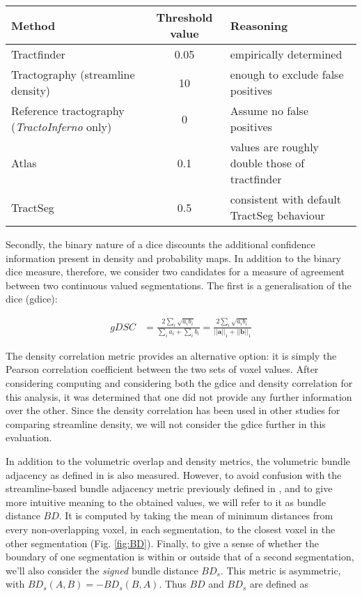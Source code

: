 \begin{table}[h!]
  \caption{}
  \label{tab:thresh}
  \small
  \begin{tabularx}{\textwidth}{>{\raggedright\arraybackslash}X c >{\raggedright\arraybackslash}X}
    \toprule
    Method    & Threshold value & Reasoning \\
    \midrule
    Tractfinder   & 0.05 & empirically determined \\
    Tractography (streamline density) & 10 & enough to exclude false positives \\
    Reference tractography (\textit{TractoInferno} only) & 0 & Assume no false positives \\
    Atlas         & 0.1 & values are roughly double those of tractfinder \\
    TractSeg      & 0.5 & consistent with default TractSeg behaviour \\ \bottomrule
  \end{tabularx}
\end{table}

Secondly, the binary nature of a \gls{dice} discounts the additional confidence information present in density and probability maps.
In addition to the binary \gls{dice} measure, therefore, we consider two candidates for a measure of agreement between two continuous valued segmentations.
The first is a generalisation of the \gls{dice} (\gls{gdice}):

\begin{align}
  gDSC &= \frac{2 \sum_i \sqrt{a_ib_i} }{\sum_ia_i + \sum_ib_i}
  =  \frac{2 \sum_i \sqrt{a_ib_i} }{||\mathbf{a}||_1 + ||\mathbf{b}||_1}
\end{align}

The density correlation metric provides an alternative option:
it is simply the Pearson correlation coefficient between the two sets of voxel values.
After considering computing and considering both the \gls{gdice} and density correlation for this analysis, it was determined that one did not provide any further information over the other.
Since the density correlation has been used in other studies for comparing streamline density,\autocite{Radwan2022, Schilling2021a} we will not consider the \gls{gdice} further in this evaluation.

In addition to the volumetric overlap and density metrics, the volumetric bundle adjacency as defined in \textcite{Schilling2021a} is also measured.
However, to avoid confusion with the streamline-based bundle adjacency\autocite{Radwan2022, Garyfallidis2012, Rheault2022} metric previously defined in \textcite{Garyfallidis2012},
and to give more intuitive meaning to the obtained values, we will refer to it as bundle distance $BD$.
It is computed by taking the mean of minimum distances from every non-overlapping voxel, in each segmentation, to the closest voxel in the other segmentation (Fig. \ref{fig:BD}).
Finally, to give a sense of whether the boundary of one segmentation is within or outside that of a second segmentation, we'll also consider the \textit{signed} bundle distance $BD_s$.
This metric is asymmetric, with $BD_s (A,B) = -BD_s(B,A)$.
Thus $BD$ and $BD_s$ are defined as

